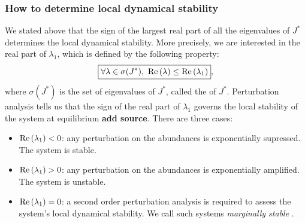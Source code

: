 \documentclass[12pt, titlepage]{report}
\begin{document}
\subsubsection{How to determine local dynamical stability}
We stated above that the sign of the largest real part of all the eigenvalues of $J^*$ determines the local dynamical stability.
More precisely, we are interested in the real part of $\lambda_1$, which is defined by the following property:
\begin{equation}
\boxed{\forall \lambda \in \sigma(J^*), \ \real{\lambda} \leq \real{\lambda_1}},
\end{equation}
where $\sigma(J^*)$ is the set of eigenvalues of $J^*$, called the  of $J^*$. Perturbation analysis tells us that the sign of the real part of $\lambda_1$ governs the local stability of the system at equilibrium \textbf{add source}. There are three cases:
\begin{itemize}
\item $\text{Re}\left(\lambda_1\right) < 0$: any perturbation on the abundances is exponentially supressed. The system is stable.
\item $\text{Re}\left(\lambda_1\right) > 0$: any perturbation on the abundances is exponentially amplified. The system is unstable.
\item $\text{Re}\left(\lambda_1\right)=0$: a second order perturbation analysis is required to assess the system's local dynamical stability. We call such systems \textit{marginally stable} \cite{biroli_marginally_2018}.
\end{itemize}
\end{document}
